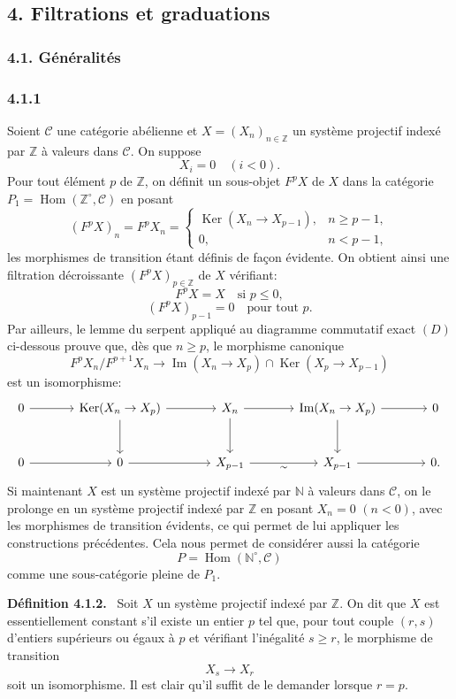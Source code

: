 \documentclass[11pt]{article}
\providecommand{\ZZ}{\mathbb{Z}}
\providecommand{\NN}{\mathbb{N}}
\newenvironment{statement}[1]{\par\medskip\noindent\textbf{#1.}\ }{\par\medskip}
\DeclareMathOperator{\Hom}{Hom}
\providecommand{\Ker}{\operatorname{Ker}}
\providecommand{\Hom}{\operatorname{Hom}}
\providecommand{\NN}{\mathbb N}
\providecommand{\cC}{\mathcal C}
\providecommand{\Im}{\operatorname{Im}}
\providecommand{\Ker}{\operatorname{Ker}}
\renewcommand{\Im}{\operatorname{Im}}
\providecommand{\Ker}{\operatorname{Ker}}
\providecommand{\Im}{\operatorname{Im}}
\providecommand{\cC}{\mathcal C}
\providecommand{\Hom}{\operatorname{Hom}}
\begin{document}
\subsection*{4. Filtrations et graduations}
\subsubsection*{4.1. Généralités}
\subsubsection*{4.1.1}
Soient $\cC$ une catégorie abélienne et $X=(X_n)_{n\in\ZZ}$ un système projectif indexé par $\ZZ$ à valeurs dans $\cC$. On suppose
\[
X_i=0\quad(i<0).
\]
Pour tout élément $p$ de $\ZZ$, on définit un sous-objet $F^pX$ de $X$ dans la catégorie $P_1=\Hom(\ZZ^\circ,\cC)$ en posant
\[
(F^pX)_n=F^pX_n=
\begin{cases}
\Ker(X_n\to X_{p-1}),& n\ge p-1,\\
0,& n<p-1,
\end{cases}
\]
les morphismes de transition étant définis de façon évidente. On obtient ainsi une filtration décroissante $(F^pX)_{p\in\ZZ}$ de $X$ vérifiant:
\[
F^pX=X\quad\text{si }p\le0,
\]
\[
(F^pX)_{p-1}=0\quad\text{pour tout }p.
\]
Par ailleurs, le lemme du serpent appliqué au diagramme commutatif exact $(D)$ ci-dessous prouve que, dès que $n\ge p$, le morphisme canonique
\[
F^pX_n/F^{p+1}X_n\longrightarrow \Im(X_n\to X_p)\cap\Ker(X_p\to X_{p-1})
\]
est un isomorphisme:
\[
\begin{tikzcd}[column sep=large,row sep=large]
0 \arrow[r] & \Ker(X_n\to X_p) \arrow[r] \arrow[d] & X_n \arrow[r] \arrow[d] & \Im(X_n\to X_p) \arrow[r] \arrow[d] & 0\\
0 \arrow[r] & 0 \arrow[r] & X_{p-1} \arrow[r,"\sim"'] & X_{p-1} \arrow[r] & 0 .
\end{tikzcd}
\]
Si maintenant $X$ est un système projectif indexé par $\NN$ à valeurs dans $\cC$, on le prolonge en un système projectif indexé par $\ZZ$ en posant $X_n=0$ $(n<0)$, avec les morphismes de transition évidents, ce qui permet de lui appliquer les constructions précédentes. Cela nous permet de considérer aussi la catégorie
\[
P=\Hom(\NN^\circ,\cC)
\]
comme une sous-catégorie pleine de $P_1$.

\begin{statement}{Définition 4.1.2}
Soit $X$ un système projectif indexé par $\ZZ$. On dit que $X$ est essentiellement constant s'il existe un entier $p$ tel que, pour tout couple $(r,s)$ d'entiers supérieurs ou égaux à $p$ et vérifiant l'inégalité $s\ge r$, le morphisme de transition
\[
X_s\longrightarrow X_r
\]
soit un isomorphisme. Il est clair qu'il suffit de le demander lorsque $r=p$.
\end{statement}
\end{document}
